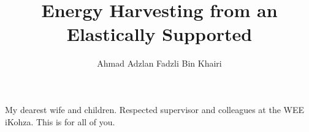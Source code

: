 \documentclass[oneside]{utmthesis}
\begin{document}
\title{Energy Harvesting from an Elastically Supported}
\author{Ahmad Adzlan Fadzli Bin Khairi}

\coverpage
\superpage
\certification
\frontmatter
\maketitle
\declaration


\begin{dedication}
  My dearest wife and children. Respected supervisor and colleagues at the WEE iKohza. This is for all of you.\
\end{dedication}
\end{document}
